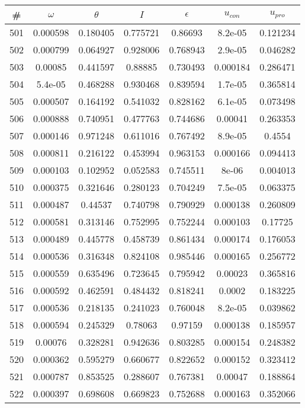 \newpage
\begin{table}
\begin{tabular}{c|c|c|c|c|c|c}
\# & $\omega$ & $\theta$ & $I$ & $\epsilon$ & $u_{con}$ & $u_{pro}$\\
\hline
501 & 0.000598 & 0.180405 & 0.775721 & 0.86693 & 8.2e-05 & 0.121234\\
502 & 0.000799 & 0.064927 & 0.928006 & 0.768943 & 2.9e-05 & 0.046282\\
503 & 0.00085 & 0.441597 & 0.88885 & 0.730493 & 0.000184 & 0.286471\\
504 & 5.4e-05 & 0.468288 & 0.930468 & 0.839594 & 1.7e-05 & 0.365814\\
505 & 0.000507 & 0.164192 & 0.541032 & 0.828162 & 6.1e-05 & 0.073498\\
506 & 0.000888 & 0.740951 & 0.477763 & 0.744686 & 0.00041 & 0.263353\\
507 & 0.000146 & 0.971248 & 0.611016 & 0.767492 & 8.9e-05 & 0.4554\\
508 & 0.000811 & 0.216122 & 0.453994 & 0.963153 & 0.000166 & 0.094413\\
509 & 0.000103 & 0.102952 & 0.052583 & 0.745511 & 8e-06 & 0.004013\\
510 & 0.000375 & 0.321646 & 0.280123 & 0.704249 & 7.5e-05 & 0.063375\\
511 & 0.000487 & 0.44537 & 0.740798 & 0.790929 & 0.000138 & 0.260809\\
512 & 0.000581 & 0.313146 & 0.752995 & 0.752244 & 0.000103 & 0.17725\\
513 & 0.000489 & 0.445778 & 0.458739 & 0.861434 & 0.000174 & 0.176053\\
514 & 0.000536 & 0.316348 & 0.824108 & 0.985446 & 0.000165 & 0.256772\\
515 & 0.000559 & 0.635496 & 0.723645 & 0.795942 & 0.00023 & 0.365816\\
516 & 0.000592 & 0.462591 & 0.484432 & 0.818241 & 0.0002 & 0.183225\\
517 & 0.000536 & 0.218135 & 0.241023 & 0.760048 & 8.2e-05 & 0.039862\\
518 & 0.000594 & 0.245329 & 0.78063 & 0.97159 & 0.000138 & 0.185957\\
519 & 0.00076 & 0.328281 & 0.942636 & 0.803285 & 0.000154 & 0.248382\\
520 & 0.000362 & 0.595279 & 0.660677 & 0.822652 & 0.000152 & 0.323412\\
521 & 0.000787 & 0.853525 & 0.288607 & 0.767381 & 0.00047 & 0.188864\\
522 & 0.000397 & 0.698608 & 0.669823 & 0.752688 & 0.000163 & 0.352066\\

\end{tabular}
\end{table}
